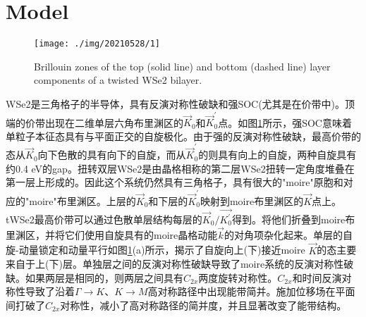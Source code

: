 \documentclass[reprint, aps, prb, showkeys]{revtex4-2}
\begin{document}
\section{Model}
\begin{figure}[t]
    \texttt{[image: ./img/20210528/1]}
    \caption{\label{fig:Brillouin} 
    Brillouin zones of the top (solid line) and bottom (dashed line) layer components of a twisted WSe2 bilayer.
    }
\end{figure}
WSe2是三角格子的半导体，具有反演对称性破缺和强SOC(尤其是在价带中)。顶端的价带出现在二维单层六角布里渊区的$\vec{K}_0$和$\vec{K}_0^{'}$点。如图\ref{fig:Brillouin}所示，强SOC意味着单粒子本征态具有与平面正交的自旋极化。由于强的反演对称性破缺，最高价带的态从$\vec{K}_0$向下色散的具有向下的自旋，而从$\vec{K}_0^{'}$的则具有向上的自旋，两种自旋具有约0.4 eV的gap。扭转双层WSe2是由晶格相称的第二层WSe2扭转一定角度堆叠在第一层上形成的。因此这个系统仍然具有三角格子，具有很大的"moire"原胞和对应的"moire"布里渊区。上层的$\vec{K}_0$和下层的$\vec{K}_0^{'}$映射到moire布里渊区的$\vec{K}$点上。tWSe2最高价带可以通过色散单层结构每层的$\vec{K}_0/\vec{K_0^{'}}$得到。将他们折叠到moire布里渊区，并将它们使用自旋具有的moire晶格动能$\vec{k}$的对角项杂化起来。单层的自旋-动量锁定和动量平行如图\ref{fig:Brillouin}(a)所示，揭示了自旋向上(下)接近moire $\vec{K}$的态主要来自于上(下)层。单独层之间的反演对称性破缺导致了moire系统的反演对称性破缺。如果两层是相同的，则两层之间具有$C_{2x}$两度旋转对称性。$C_{2x}$和时间反演对称性导致了沿着$\Gamma \rightarrow K$、$K \rightarrow M$高对称路径中出现能带简并。施加位移场在平面间打破了$C_{2x}$对称性，减小了高对称路径的简并度，并且显著改变了能带结构。
\end{document}
